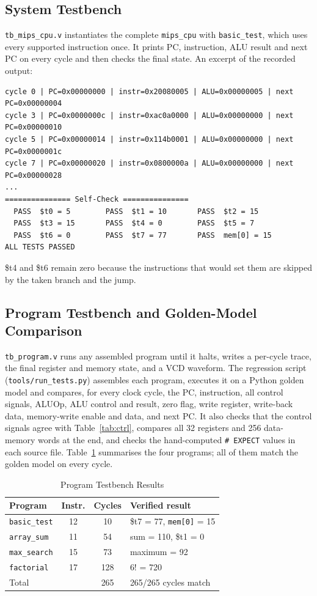 \documentclass[conference]{IEEEtran}
\begin{document}
\subsection{System Testbench}
\texttt{tb\_mips\_cpu.v} instantiates the complete \texttt{mips\_cpu} with \texttt{basic\_test}, which uses every supported instruction once. It prints PC, instruction, ALU result and next PC on every cycle and then checks the final state. An excerpt of the recorded output:
\begin{lstlisting}
cycle 0 | PC=0x00000000 | instr=0x20080005 | ALU=0x00000005 | next PC=0x00000004
cycle 3 | PC=0x0000000c | instr=0xac0a0000 | ALU=0x00000000 | next PC=0x00000010
cycle 5 | PC=0x00000014 | instr=0x114b0001 | ALU=0x00000000 | next PC=0x0000001c
cycle 7 | PC=0x00000020 | instr=0x0800000a | ALU=0x00000000 | next PC=0x00000028
...
=============== Self-Check ===============
  PASS  $t0 = 5        PASS  $t1 = 10       PASS  $t2 = 15
  PASS  $t3 = 15       PASS  $t4 = 0        PASS  $t5 = 7
  PASS  $t6 = 0        PASS  $t7 = 77       PASS  mem[0] = 15
ALL TESTS PASSED
\end{lstlisting}
\$t4 and \$t6 remain zero because the instructions that would set them are skipped by the taken branch and the jump.

\subsection{Program Testbench and Golden-Model Comparison}
\texttt{tb\_program.v} runs any assembled program until it halts, writes a per-cycle trace, the final register and memory state, and a VCD waveform. The regression script (\texttt{tools/run\_tests.py}) assembles each program, executes it on a Python golden model and compares, for every clock cycle, the PC, instruction, all control signals, ALUOp, ALU control and result, zero flag, write register, write-back data, memory-write enable and data, and next PC. It also checks that the control signals agree with Table~\ref{tab:ctrl}, compares all 32 registers and 256 data-memory words at the end, and checks the hand-computed \texttt{\# EXPECT} values in each source file. Table~\ref{tab:progs} summarises the four programs; all of them match the golden model on every cycle.

\begin{table}[t]
\caption{Program Testbench Results}
\label{tab:progs}
\centering\footnotesize\setlength{\tabcolsep}{4pt}
\begin{tabular}{@{}lccl@{}}
\toprule
Program & Instr. & Cycles & Verified result\\
\midrule
\texttt{basic\_test} & 12 & 10 & \$t7 = 77, \texttt{mem[0]} = 15\\
\texttt{array\_sum}  & 11 & 54 & sum = 110, \$t1 = 0\\
\texttt{max\_search} & 15 & 73 & maximum = 92\\
\texttt{factorial}   & 17 & 128 & 6! = 720\\
\midrule
Total & & 265 & 265/265 cycles match\\
\bottomrule
\end{tabular}
\end{table}
\end{document}
